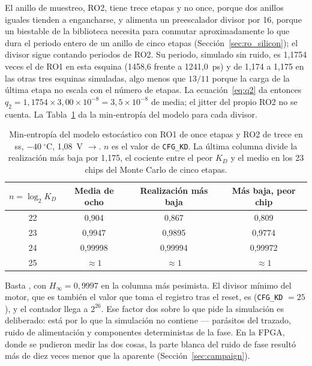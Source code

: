 El anillo de muestreo, RO2, tiene trece etapas y no once, porque dos
anillos iguales tienden a engancharse, y alimenta un preescalador
divisor por 16, porque un biestable de la biblioteca necesita para
conmutar aproximadamente lo que dura el periodo entero de un anillo de
cinco etapas \est{} (Sección~\ref{sec:ro_silicon}); el divisor sigue
contando periodos de RO2. Su periodo, simulado sin ruido, es 1,1754 veces
el de RO1 en esta esquina (1458,6 frente a 1241,0~ps) y de 1,174 a 1,175
en las otras tres esquinas simuladas, algo menos que $13/11$ porque la
carga de la última etapa no escala con el número de etapas. La
ecuación~\eqref{eq:q2} da entonces
$q_2 = 1{,}1754 \times 3{,}00\times10^{-8} = 3{,}5\times10^{-8}$ de
media; el jitter del propio RO2 no se cuenta. La Tabla~\ref{tab:ihp_e11}
da la min-entropía del modelo para cada divisor.

\begin{table}[htbp]
\centering
\caption{Min-entropía del modelo estocástico con RO1 de once etapas y RO2
de trece en ss, $-40~^\circ$C, 1,08~V \simu{}$\rightarrow$\est{}. $n$ es
el valor de \texttt{CFG\_KD}. La última columna divide la realización más
baja por 1,175, el cociente entre el peor $K_D$ y el medio en los 23
chips del Monte Carlo de cinco etapas.}
\label{tab:ihp_e11}
\small
\begin{tabular}{@{}cccc@{}}
\toprule
$n = \log_2 K_D$ & Media de ocho & Realización más baja & Más baja, peor chip \\
\midrule
22 & 0,904   & 0,867   & 0,809 \\
23 & 0,9947  & 0,9895  & 0,9774 \\
24 & 0,99998 & 0,99994 & 0,99972 \\
25 & $\approx 1$ & $\approx 1$ & $\approx 1$ \\
\bottomrule
\end{tabular}
\end{table}

Basta , con $H_\infty = 0{,}9997$ en la columna más pesimista. El
divisor mínimo del motor, que es también el valor que toma el registro
tras el reset, es  (\texttt{CFG\_KD} $= 25$), y el contador llega a
$2^{26}$. Ese factor dos sobre lo que pide la simulación es deliberado:
está por lo que la simulación no contiene --- parásitos del trazado,
ruido de alimentación y componentes deterministas de la fase. En la
\ac{FPGA}, donde se pudieron medir las dos cosas, la parte blanca del
ruido de fase resultó más de diez veces menor que la aparente
(Sección~\ref{sec:campaign}).

